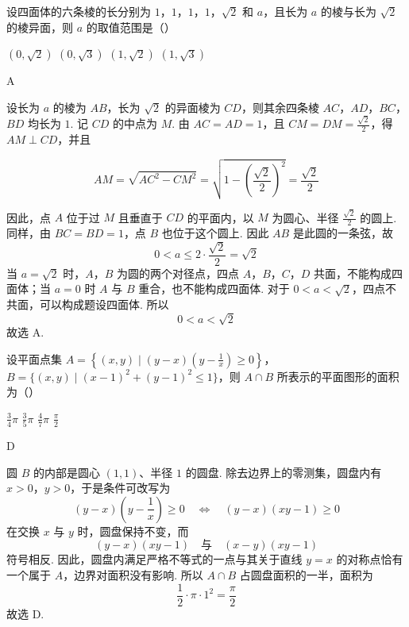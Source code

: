 \begin{problem}
设四面体的六条棱的长分别为 \(1\)，\(1\)，\(1\)，\(1\)，\(\sqrt{2}\) 和 \(a\)，且长为 \(a\) 的棱与长为 \(\sqrt{2}\) 的棱异面，则 \(a\) 的取值范围是（\quad）

\choices
    {\((0, \sqrt{2})\)}
    {\((0, \sqrt{3})\)}
    {\((1, \sqrt{2})\)}
    {\((1, \sqrt{3})\)}

\begin{answer}
A
\end{answer}

\begin{solution}
设长为 \(a\) 的棱为 \(AB\)，长为 \(\sqrt2\) 的异面棱为 \(CD\)，则其余四条棱 \(AC\)，\(AD\)，\(BC\)，\(BD\) 均长为 \(1\). 记 \(CD\) 的中点为 \(M\). 由 \(AC=AD=1\)，且 \(CM=DM=\frac{\sqrt2}{2}\)，得 \(AM\perp CD\)，并且

\[
AM=\sqrt{AC^{2}-CM^{2}}=\sqrt{1-\left(\frac{\sqrt2}{2}\right)^{2}}=\frac{\sqrt2}{2}
\]

因此，点 \(A\) 位于过 \(M\) 且垂直于 \(CD\) 的平面内，以 \(M\) 为圆心、半径 \(\frac{\sqrt2}{2}\) 的圆上. 同样，由 \(BC=BD=1\)，点 \(B\) 也位于这个圆上.
因此 \(AB\) 是此圆的一条弦，故
\[
0<a\le2\cdot\frac{\sqrt2}{2}=\sqrt2
\]
当 \(a=\sqrt2\) 时，\(A\)，\(B\) 为圆的两个对径点，四点 \(A\)，\(B\)，\(C\)，\(D\) 共面，不能构成四面体；当 \(a=0\) 时 \(A\) 与 \(B\) 重合，也不能构成四面体. 对于 \(0<a<\sqrt2\)，四点不共面，可以构成题设四面体. 所以
\[
0<a<\sqrt2
\]
故选 A.
\end{solution}
\end{problem}

\begin{problem}
设平面点集 \(A = \left\{(x, y) \mid (y - x)\left(y - \frac{1}{x}\right) \geqslant 0\right\}\)，\(B = \{(x, y) \mid (x - 1)^2 + (y - 1)^2 \leqslant 1\}\)，则 \(A \cap B\) 所表示的平面图形的面积为（\quad）

\choices
    {\(\frac{3}{4}\pi\)}
    {\(\frac{3}{5}\pi\)}
    {\(\frac{4}{7}\pi\)}
    {\(\frac{\pi}{2}\)}

\begin{answer}
D
\end{answer}

\begin{solution}
圆 \(B\) 的内部是圆心 \((1,1)\)、半径 \(1\) 的圆盘. 除去边界上的零测集，圆盘内有 \(x>0\)，\(y>0\)，于是条件可改写为
\[
(y-x)\left(y-\frac1x\right)\ge0
\quad\Longleftrightarrow\quad
(y-x)(xy-1)\ge0
\]
在交换 \(x\) 与 \(y\) 时，圆盘保持不变，而
\[
\left(y-x\right)(xy-1)
\quad\text{与}\quad
\left(x-y\right)(xy-1)
\]
符号相反. 因此，圆盘内满足严格不等式的一点与其关于直线 \(y=x\) 的对称点恰有一个属于 \(A\)，边界对面积没有影响. 所以 \(A\cap B\) 占圆盘面积的一半，面积为
\[
\frac12\cdot\pi\cdot1^{2}=\frac\pi2
\]
故选 D.
\end{solution}
\end{problem}

